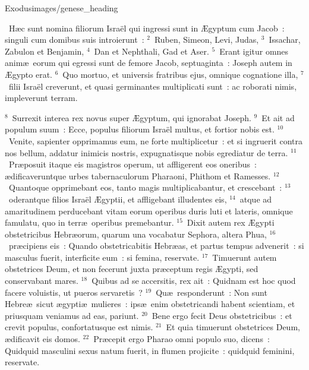 {Exodus}{images/genese_heading}

~\lettrine[lines=10,image=true,loversize=0.05,lraise=-0.03]{H}{}\ae c sunt nomina filiorum Isra\"el qui ingressi sunt in \AE gyptum cum Jacob~: singuli cum domibus suis introierunt~:
${}^{2}$~Ruben, Simeon, Levi, Judas,
${}^{3}$~Issachar, Zabulon et Benjamin,
${}^{4}$~Dan et Nephthali, Gad et Aser.
${}^{5}$~Erant igitur omnes anim\ae\ eorum qui egressi sunt de femore Jacob, septuaginta~: Joseph autem in \AE gypto erat.
${}^{6}$~Quo mortuo, et universis fratribus ejus, omnique cognatione illa,
${}^{7}$~filii Isra\"el creverunt, et quasi germinantes multiplicati sunt~: ac roborati nimis, impleverunt terram.


${}^{8}$~Surrexit interea rex novus super \AE gyptum, qui ignorabat Joseph.
${}^{9}$~Et ait ad populum suum~: Ecce, populus filiorum Isra\"el multus, et fortior nobis est.
${}^{10}$~Venite, sapienter opprimamus eum, ne forte multiplicetur~: et si ingruerit contra nos bellum, addatur inimicis nostris, expugnatisque nobis egrediatur de terra.
${}^{11}$~Pr\ae posuit itaque eis magistros operum, ut affligerent eos oneribus~: \ae dificaveruntque urbes tabernaculorum Pharaoni, Phithom et Ramesses.
${}^{12}$~Quantoque opprimebant eos, tanto magis multiplicabantur, et crescebant~:
${}^{13}$~oderantque filios Isra\"el \AE gyptii, et affligebant illudentes eis,
${}^{14}$~atque ad amaritudinem perducebant vitam eorum operibus duris luti et lateris, omnique famulatu, quo in terr\ae\ operibus premebantur.
${}^{15}$~Dixit autem rex \AE gypti obstetricibus Hebr\ae orum, quarum una vocabatur Sephora, altera Phua,
${}^{16}$~pr\ae cipiens eis~: Quando obstetricabitis Hebr\ae as, et partus tempus advenerit~: si masculus fuerit, interficite eum~: si femina, reservate.
${}^{17}$~Timuerunt autem obstetrices Deum, et non fecerunt juxta pr\ae ceptum regis \AE gypti, sed conservabant mares.
${}^{18}$~Quibus ad se accersitis, rex ait~: Quidnam est hoc quod facere voluistis, ut pueros servaretis~?
${}^{19}$~Qu\ae\ responderunt~: Non sunt Hebre\ae\ sicut \ae gypti\ae\ mulieres~: ips\ae\ enim obstetricandi habent scientiam, et priusquam veniamus ad eas, pariunt.
${}^{20}$~Bene ergo fecit Deus obstetricibus~: et crevit populus, confortatusque est nimis.
${}^{21}$~Et quia timuerunt obstetrices Deum, \ae dificavit eis domos.
${}^{22}$~Pr\ae cepit ergo Pharao omni populo suo, dicens~: Quidquid masculini sexus natum fuerit, in flumen projicite~: quidquid feminini, reservate.
